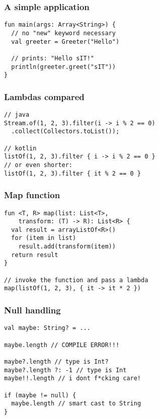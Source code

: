 \begin{frame}[fragile] \frametitle{A simple application}
\begin{lstlisting}
fun main(args: Array<String>) {
  // no "new" keyword necessary
  val greeter = Greeter("Hello")

  // prints: "Hello sIT!"
  println(greeter.greet("sIT"))
}
\end{lstlisting}
\end{frame}

\begin{frame}[fragile] \frametitle{Lambdas compared}
\begin{lstlisting}
// java
Stream.of(1, 2, 3).filter(i -> i % 2 == 0)
  .collect(Collectors.toList());

// kotlin
listOf(1, 2, 3).filter { i -> i % 2 == 0 }
// or even shorter:
listOf(1, 2, 3).filter { it % 2 == 0 }
\end{lstlisting}
\end{frame}

\begin{frame}[fragile] \frametitle{Map function}
\begin{lstlisting}
fun <T, R> map(list: List<T>,
    transform: (T) -> R): List<R> {
  val result = arrayListOf<R>()
  for (item in list)
    result.add(transform(item))
  return result
}

// invoke the function and pass a lambda
map(listOf(1, 2, 3), { it -> it * 2 })
\end{lstlisting}
\end{frame}

\begin{frame}[fragile] \frametitle{Null handling}
\begin{lstlisting}
val maybe: String? = ...

maybe.length // COMPILE ERROR!!!

maybe?.length // type is Int?
maybe?.length ?: -1 // type is Int
maybe!!.length // i dont f*cking care!

if (maybe != null) {
  maybe.length // smart cast to String
}
\end{lstlisting}
\end{frame}



